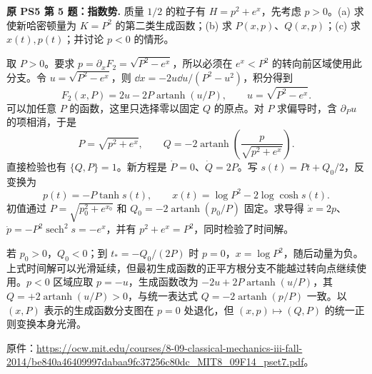 \begin{example}
\textbf{原 PS5 第 5 题：指数势.} 
质量 $1/2$ 的粒子有 $H=p^2+e^x$，先考虑 $p>0$。(a) 求使新哈密顿量为 $K=P^2$ 的第二类生成函数；(b) 求 $P(x,p)$、$Q(x,p)$；(c) 求 $x(t),p(t)$；并讨论 $p<0$ 的情形。
\end{example}
\begin{solution}
取 $P>0$。要求 $p=\partial_xF_2=\sqrt{P^2-e^x}$，所以必须在 $e^x<P^2$ 的转向前区域使用此分支。令 $u=\sqrt{P^2-e^x}$，则 $\dd x=-2u\dd u/(P^2-u^2)$，积分得到
\[
 F_2(x,P)=2u-2P\operatorname{artanh}(u/P),\qquad u=\sqrt{P^2-e^x}.
\]
可以加任意 $P$ 的函数，这里只选择零以固定 $Q$ 的原点。对 $P$ 求偏导时，含 $\partial_Pu$ 的项相消，于是
\[
 P=\sqrt{p^2+e^x},\qquad
 Q=-2\operatorname{artanh}\left(\frac p{\sqrt{p^2+e^x}}\right).
\]
直接检验也有 $\{Q,P\}=1$。新方程是 $\dot P=0$、$\dot Q=2P$。写 $s(t)=Pt+Q_0/2$，反变换为
\[
 p(t)=-P\tanh s(t),\qquad
 x(t)=\log P^2-2\log\cosh s(t).
\]
初值通过 $P=\sqrt{p_0^2+e^{x_0}}$ 和 $Q_0=-2\operatorname{artanh}(p_0/P)$ 固定。求导得 $\dot x=2p$、$\dot p=-P^2\operatorname{sech}^2s=-e^x$，并有 $p^2+e^x=P^2$，同时检验了时间解。

若 $p_0>0$，$Q_0<0$；到 $t_*=-Q_0/(2P)$ 时 $p=0$，$x=\log P^2$，随后动量为负。上式时间解可以光滑延续，但最初生成函数的正平方根分支不能越过转向点继续使用。$p<0$ 区域应取 $p=-u$，生成函数改为 $-2u+2P\operatorname{artanh}(u/P)$，其 $Q=+2\operatorname{artanh}(u/P)>0$，与统一表达式 $Q=-2\operatorname{artanh}(p/P)$ 一致。以 $(x,P)$ 表示的生成函数分支图在 $p=0$ 处退化，但 $(x,p)\mapsto(Q,P)$ 的统一正则变换本身光滑。
\end{solution}

原件：\url{https://ocw.mit.edu/courses/8-09-classical-mechanics-iii-fall-2014/be840a46409997dabaa9fc37256c80dc_MIT8_09F14_pset7.pdf}。

